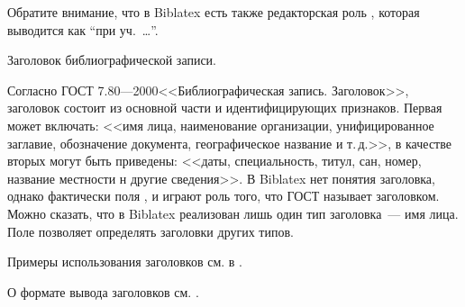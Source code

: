 \documentclass[10pt,a4paper,headings=small,numbers=enddot,english,russian]{ltxdockit}
\newcommand*{\biblatex}{Biblatex\xspace}
\newcommand*{\gostheadname}[1][]{ГОСТ#1 7.80---2000\xspace}
\begin{document}
\begin{fieldlist}
Обратите внимание, что в \biblatex есть также редакторская роль ,
которая выводится как \enquote{при уч.~\ldots}.


Заголовок библиографической записи.

Согласно \gostheadname <<Библиографическая запись. Заголовок>>,
заголовок состоит из основной части и идентифицирующих признаков.
Первая может включать: <<имя лица, наименование организации, унифицированное
заглавие, обозначение документа, географическое название и т.\,д.>>,
в качестве вторых могут быть приведены: <<даты,
специальность, титул, сан, номер, название местности н другие сведения>>.
В \biblatex нет понятия заголовка, однако фактически поля ,  и
 играют роль того, что ГОСТ называет заголовком. Можно сказать,
что в \biblatex реализован лишь один тип заголовка~--- имя лица. Поле 
позволяет определять заголовки других типов.%

Примеры использования заголовков см. в .

О формате вывода заголовков см. .



\end{fieldlist}
\end{document}

